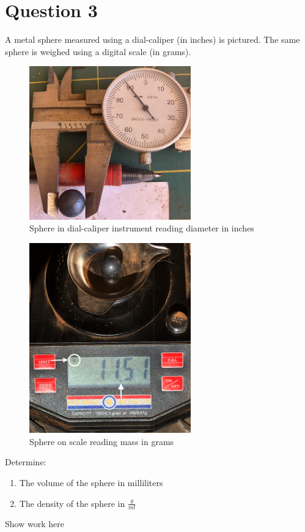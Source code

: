 \documentclass[12pt]{article}
\begin{document}
\section*{Question 3}
A metal sphere measured using a dial-caliper (in inches) is pictured. The same sphere is weighed using a digital scale (in grams). 
\begin{figure}[h!] %
   \centering
   \includegraphics[width=2.75in]{sphere-dimension.png} 
   \caption{Sphere in dial-caliper instrument reading diameter in inches}
   \label{fig:sphere-dimension}
\end{figure}

\begin{figure}[h!] %
   \centering
   \includegraphics[width=2.75in]{sphere-mass.png} 
   \caption{Sphere on scale reading mass in grams}
   \label{fig:sphere-mass}
\end{figure}
\newpage
Determine:
\begin{enumerate}
\item The volume of the sphere in milliliters
\item The density of the sphere in $\frac{g}{ml}$
\end{enumerate}
\clearpage
Show work here
\clearpage
\end{document}

